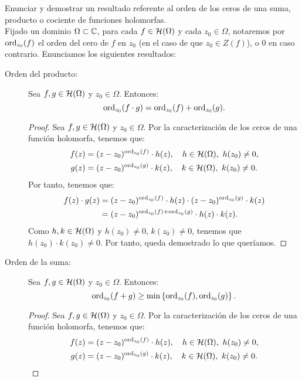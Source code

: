 \begin{ejercicio}
    Enunciar y demostrar un resultado referente al orden de los ceros de una suma, producto o cociente de funciones holomorfas.\\

    Fijado un dominio $\Omega\subset \mathbb{C}$, para cada $f\in \mathcal{H}(\Omega)$ y cada $z_0\in \Omega$, notaremos por $\operatorname{ord}_{z_0}(f)$ el orden del cero de $f$ en $z_0$ (en el caso de que $z_0\in Z(f)$), o $0$ en caso contrario. Enunciamos los siguientes resultados:
    \begin{description}
        \item[Orden del producto:] Sea $f,g\in \mathcal{H}(\Omega)$ y $z_0\in \Omega$. Entonces:
        \begin{equation*}
            \operatorname{ord}_{z_0}(f\cdot g) = \operatorname{ord}_{z_0}(f) + \operatorname{ord}_{z_0}(g).
        \end{equation*}
        \begin{proof}
            Sea $f,g\in \mathcal{H}(\Omega)$ y $z_0\in \Omega$. Por la caracterización de los ceros de una función holomorfa, tenemos que:
            \begin{align*}
                f(z) &= (z-z_0)^{\operatorname{ord}_{z_0}(f)}\cdot h(z), \quad h\in \mathcal{H}(\Omega),\ h(z_0)\neq 0, \\
                g(z) &= (z-z_0)^{\operatorname{ord}_{z_0}(g)}\cdot k(z), \quad k\in \mathcal{H}(\Omega),\ k(z_0)\neq 0.
            \end{align*}
            Por tanto, tenemos que:
            \begin{align*}
                f(z)\cdot g(z) &= (z-z_0)^{\operatorname{ord}_{z_0}(f)}\cdot h(z)\cdot (z-z_0)^{\operatorname{ord}_{z_0}(g)}\cdot k(z) \\
                &= (z-z_0)^{\operatorname{ord}_{z_0}(f)+\operatorname{ord}_{z_0}(g)}\cdot h(z)\cdot k(z).
            \end{align*}
            Como $h,k\in \mathcal{H}(\Omega)$ y $h(z_0)\neq 0$, $k(z_0)\neq 0$, tenemos que $h(z_0)\cdot k(z_0)\neq 0$. Por tanto, queda demostrado lo que queríamos.
        \end{proof}

        \item[Orden de la suma:] Sea $f,g\in \mathcal{H}(\Omega)$ y $z_0\in \Omega$. Entonces:
        \begin{equation*}
            \operatorname{ord}_{z_0}(f+g) \geq \min\left\{ \operatorname{ord}_{z_0}(f),\operatorname{ord}_{z_0}(g) \right\}.
        \end{equation*}
        \begin{proof}
            Sea $f,g\in \mathcal{H}(\Omega)$ y $z_0\in \Omega$. Por la caracterización de los ceros de una función holomorfa, tenemos que:
            \begin{align*}
                f(z) &= (z-z_0)^{\operatorname{ord}_{z_0}(f)}\cdot h(z), \quad h\in \mathcal{H}(\Omega),\ h(z_0)\neq 0, \\
                g(z) &= (z-z_0)^{\operatorname{ord}_{z_0}(g)}\cdot k(z), \quad k\in \mathcal{H}(\Omega),\ k(z_0)\neq 0.
            \end{align*}


\end{proof}
\end{description}
\end{ejercicio}
